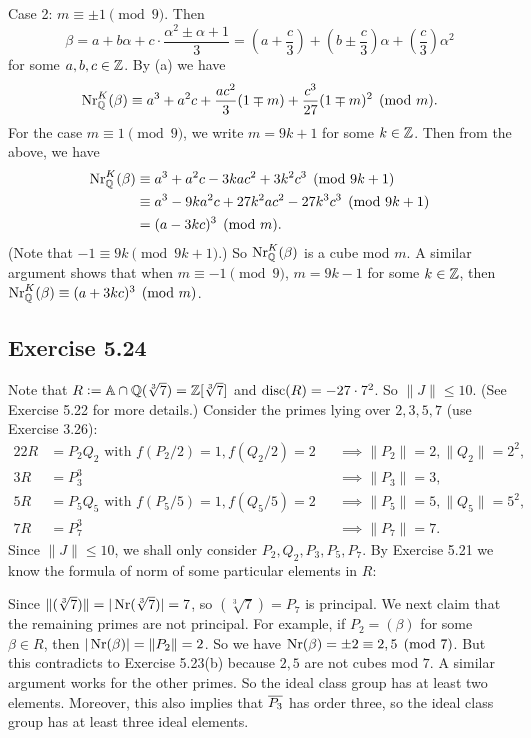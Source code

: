 \documentclass[../Marcus.tex]{subfiles}
\begin{document}
Case 2: $m\equiv\pm1\pmod{9}$. Then
$$
\beta = a + b\alpha + c \cdot \frac{\alpha^2 \pm \alpha + 1}{3}
= \left(a+\frac{c}{3}\right) + \left(b\pm\frac{c}{3}\right)\alpha + \left(\frac{c}{3}\right)\alpha^2
$$
for some $a,b,c\in \mathbb{Z}$. By (a) we have
$$
\operatorname{Nr}^K_{\mathbb{Q}}(\beta) \equiv a^3 + a^2c + \frac{ac^2}{3}(1 \mp m) + \frac{c^3}{27}(1\mp m)^2  \pmod{m}.
$$
For the case $m\equiv 1\pmod{9}$, we write $m = 9k+1$ for some $k\in\mathbb{Z}$. Then from the above, we have
\begin{align*}
\operatorname{Nr}^K_{\mathbb{Q}}(\beta) 
&\equiv a^3 + a^2c - 3kac^2 + 3k^2c^3  \pmod{9k+1}    \\
&\equiv a^3 - 9ka^2c + 27k^2ac^2 - 27k^3c^3  \pmod{9k+1}    \\
&= (a-3kc)^3 \pmod{m}.
\end{align*}
(Note that $-1 \equiv 9k \pmod{9k+1}$.) So $\operatorname{Nr}^K_{\mathbb{Q}}(\beta)$ is a cube mod $m$. A similar argument shows that when $m\equiv -1\pmod{9}$, $m = 9k-1$ for some $k\in\mathbb{Z}$, then $\operatorname{Nr}^K_{\mathbb{Q}}(\beta) \equiv (a+3kc)^3 \pmod{m}$.

\subsection*{Exercise 5.24}

Note that $R := \mathbb{A} \cap \mathbb{Q}(\sqrt[3]{7}) = \mathbb{Z}[\sqrt[3]{7}]$ and $\operatorname{disc}(R) = -27 \cdot 7^2$. So $\|J\| \leq 10$. (See Exercise 5.22 for more details.) Consider the primes lying over $2,3,5,7$ (use Exercise 3.26):
\begin{alignat*}{2}
2R &= P_2Q_2 \text{ with } f(P_2/2) = 1, f(Q_2/2) = 2 &&\implies \|P_2\| = 2, \|Q_2\| = 2^2,    \\
3R &= P_3^3 &&\implies \|P_3\| = 3,    \\
5R &= P_5Q_5 \text{ with } f(P_5/5) = 1, f(Q_5/5) = 2 &&\implies \|P_5\| = 5, \|Q_5\| = 5^2,    \\
7R &= P_7^3 &&\implies \|P_7\| = 7.
\end{alignat*}
Since $\|J\| \leq 10$, we shall only consider $P_2,Q_2,P_3,P_5,P_7$. By Exercise 5.21 we know the formula of norm of some particular elements in $R$:

Since $\|(\sqrt[3]{7})\| = |\operatorname{Nr}(\sqrt[3]{7})| = 7$, so $(\sqrt[3]{7}) = P_7$ is principal. We next claim that the remaining primes are not principal. For example, if $P_2 = (\beta)$ for some $\beta \in R$, then $|\operatorname{Nr}(\beta)| = \|P_2\| = 2$. So we have $\operatorname{Nr}(\beta) = \pm2 \equiv 2,5 \pmod{7}$. But this contradicts to Exercise 5.23(b) because $2,5$ are not cubes mod $7$. A similar argument works for the other primes. So the ideal class group has at least two elements. Moreover, this also implies that $\overline{P_3}$ has order three, so the ideal class group has at least three ideal elements.
\end{document}
